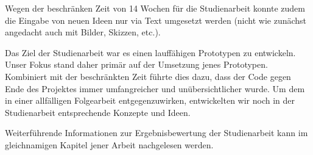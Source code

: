 Wegen der beschränken Zeit von 14 Wochen für die Studienarbeit konnte zudem die Eingabe von neuen Ideen nur via Text umgesetzt werden (nicht wie zunächst angedacht auch mit Bilder, Skizzen, etc.).

Das Ziel der Studienarbeit war es einen lauffähigen Prototypen zu entwickeln. Unser Fokus stand daher primär auf der Umsetzung jenes Prototypen. Kombiniert mit der beschränkten Zeit führte dies dazu, dass der Code gegen Ende des Projektes immer umfangreicher und unübersichtlicher wurde. Um dem in einer allfälligen Folgearbeit entgegenzuwirken, entwickelten wir noch in der Studienarbeit entsprechende Konzepte und Ideen. 

Weiterführende Informationen zur Ergebnisbewertung der Studienarbeit kann im gleichnamigen Kapitel jener Arbeit \cite{methode635-sa} nachgelesen werden.


\newpage


\newpage


\newpage


\newpage


\newpage


\newpage


\newpage


\newpage

